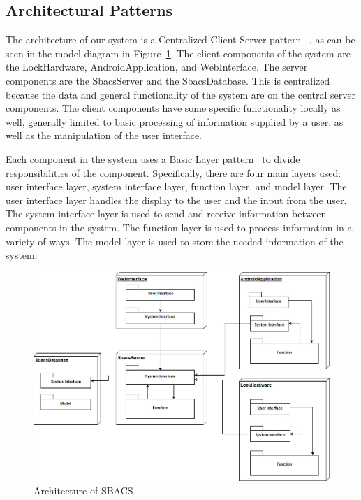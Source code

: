 \documentclass[12pt]{report}
\let\Oldsubsection\subsection
\renewcommand{\subsection}{\FloatBarrier\Oldsubsection}
\begin{document}

\subsection{Architectural Patterns} \label{architectural-patterns}


The architecture of our system is a Centralized Client-Server pattern ~\autocite{CLIENTSERVERARCH}, as can be seen 
in the model diagram in Figure~\ref{fig:architecture-sbacs}. The client components of
the system are the LockHardware, AndroidApplication, and WebInterface. The server components are the SbacsServer and
the SbacsDatabase. This is centralized because the data and general functionality of the system are on the central
server components. The client components have some specific functionality locally as well, generally limited to
basic processing of information supplied by a user, as well as the manipulation of the user interface.

Each component in the system uses a Basic Layer pattern~\autocite{LAYERPATTERNBOOK} to divide responsibilities of the component. Specifically,
there are four main layers used: user interface layer, system interface layer, function layer, and model layer.
The user interface layer handles the display to the user and the input from the user. The system interface layer
is used to send and receive information between components in the system. The function layer is used to process
information in a variety of ways. The model layer is used to store the needed information of the system.

\begin{figure}
    \centering
    \includegraphics[width=\textwidth]{Diagrams/ArchitectureSBACS}
    \caption{Architecture of SBACS}
    \label{fig:architecture-sbacs}
\end{figure}
\end{document}
